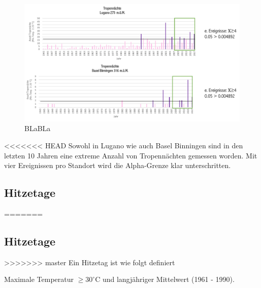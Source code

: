 \begin{refsection}
\begin{figure}[htbp]
\centering
\includegraphics[width=1.0\textwidth]{extrem/Tropennacht.pdf}
\caption{BLaBLa}
\label{Tropennacht}
\end{figure}

<<<<<<< HEAD
Sowohl in Lugano wie auch Basel Binningen sind in den letzten 10 Jahren eine extreme Anzahl von Tropennächten gemessen worden. Mit vier Ereignissen pro Standort wird die Alpha-Grenze klar unterschritten.


\subsection{Hitzetage} \label{Hitzetage}
=======

\subsection{Hitzetage}
>>>>>>> master
Ein Hitzetag ist wie folgt definiert

\begin{definition}
Maximale Temperatur $\ge 30^{\circ}$C und langjähriger Mittelwert (1961 - 1990).
\end{definition}


\end{refsection}
